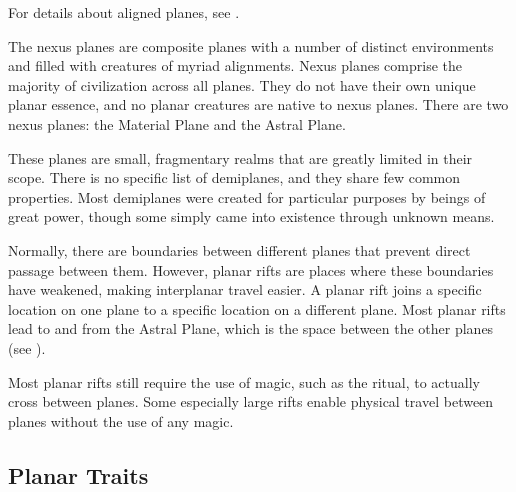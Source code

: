     For details about aligned planes, see .

     The nexus planes are composite planes with a number of distinct environments and filled with creatures of myriad alignments.
    Nexus planes comprise the majority of civilization across all planes.
    They do not have their own unique planar essence, and no planar creatures are native to nexus planes.
    There are two nexus planes: the Material Plane and the Astral Plane.

     These planes are small, fragmentary realms that are greatly limited in their scope.
    There is no specific list of demiplanes, and they share few common properties.
    Most demiplanes were created for particular purposes by beings of great power, though some simply came into existence through unknown means.

    Normally, there are boundaries between different planes that prevent direct passage between them.
    However, planar rifts are places where these boundaries have weakened, making interplanar travel easier.
    A planar rift joins a specific location on one plane to a specific location on a different plane.
    Most planar rifts lead to and from the Astral Plane, which is the space between the other planes (see ).

    Most planar rifts still require the use of magic, such as the  ritual, to actually cross between planes.
    Some especially large rifts enable physical travel between planes without the use of any magic.

  \subsection{Planar Traits}

